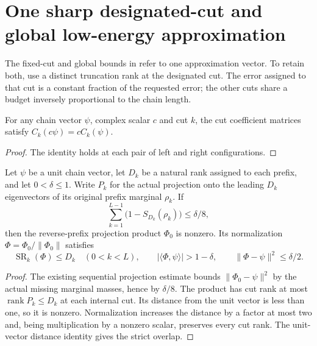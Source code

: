 \section{One sharp designated-cut and global low-energy approximation}

The fixed-cut and global bounds in
\cite[Theorem~thm:al-ld, lines 1096--1105]{Arad2016RigorousRG}
refer to one approximation vector. To retain both, use a distinct
truncation rank at the designated cut. The error assigned to that cut
is a constant fraction of the requested error; the other cuts share a
budget inversely proportional to the chain length.

\begin{lemma}
    \label{lem:cut_matrix_scalar}
    \leanok
    For any chain vector $\psi$, complex scalar $c$ and cut $k$,
    the cut coefficient matrices satisfy $C_k(c\psi)=cC_k(\psi)$.
\end{lemma}
\begin{proof}\leanok
    The identity holds at each pair of left and right configurations.
\end{proof}

\begin{lemma}
    \label{lem:variable_normalized_sequential}
    \leanok
    Let $\psi$ be a unit chain vector, let $D_k$ be a natural rank
    assigned to each prefix, and let $0<\delta\le1$.
    Write $P_k$ for the actual projection onto the leading $D_k$
    eigenvectors of its original prefix marginal $\rho_k$.
    If
    \[
        \sum_{k=1}^{L-1}\bigl(1-S_{D_k}(\rho_k)\bigr)\le\delta/8,
    \]
    then the reverse-prefix projection product $\Phi_0$ is nonzero.
    Its normalization $\Phi=\Phi_0/\|\Phi_0\|$ satisfies
    \[
        \operatorname{SR}_k(\Phi)\le D_k\quad(0<k<L),\qquad
        |\langle\Phi,\psi\rangle|>1-\delta,\qquad
        \|\Phi-\psi\|^2\le\delta/2.
    \]
\end{lemma}
\begin{proof}\leanok
    The existing sequential projection estimate bounds
    $\|\Phi_0-\psi\|^2$ by the actual missing marginal masses,
    hence by $\delta/8$. The product has cut rank at most
    $\operatorname{rank}P_k\le D_k$ at each internal cut.
    Its distance from the unit vector is less than one, so it is nonzero.
    Normalization increases the distance by a factor at most two and,
    being multiplication by a nonzero scalar, preserves every cut rank.
    The unit-vector distance identity gives the strict overlap.
\end{proof}

